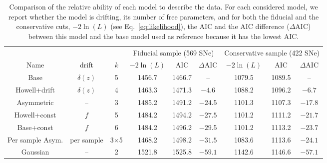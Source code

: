 \documentclass[]{aa}
\begin{document}
\begin{table}
    \centering
    \caption{Comparison of the relative ability of each model to describe the
        data. For each considered model, we report whether the model is
        drifting, its number of free parameters, and for both the fiducial and
        the conservative cuts, $-2\ln(L)$ (see Eq.~\ref{eq:likelihood}), the AIC
        and the AIC difference ($\Delta$AIC) between this model and the base
    model used as reference because it has the lowest AIC.}
    \label{tab:comp}
    \begin{tabular}{ccc|ccc|ccc}
        \hline\hline
        & & & \multicolumn{3}{c}{Fiducial sample (569 SNe)}
            & \multicolumn{3}{|c}{Conservative sample (422 SNe)} \\
        Name & drift & $k$ &
        $-2\ln(L)$ & AIC & $\Delta$AIC & $-2\ln(L)$ & AIC & $\Delta$AIC\\
        \hline

        Base & $\delta(z)$ & 5
        & 1456.7 & 1466.7 & -- 
        & 1079.5 & 1089.5 & -- \\

        Howell+drift & $\delta(z)$ & 4
        & 1463.3 & 1471.3 & $-4.6$
        & 1088.2 & 1096.2 & $-6.7$ 
        \\

        Asymmetric & -- & 3
        & 1485.2 & 1491.2 & $-24.5$
        & 1101.3 & 1107.3 & $-17.8$ 
        \\

        Howell+const & $f$ & 5
        & 1484.2 & 1494.2 & $-27.5$
        & 1101.2 & 1111.2 & $-21.7$ 
        \\

        Base+const & $f$ & 6
        & 1484.2 & 1496.2 & $-29.5$
        & 1101.2 & 1113.2 & $-23.7$ 
        \\

        Per sample Asym. & per sample & 3$\times$5
        & 1468.2 & 1498.2 & $-31.5$
        & 1083.6 & 1113.6 & $-24.1$ 
        \\

        Gaussian & -- & 2
        & 1521.8 & 1525.8 & $-59.1$
        & 1142.6 & 1146.6 & $-57.1$ 
        \\
        \hline
    \end{tabular}
\end{table}
\end{document}
